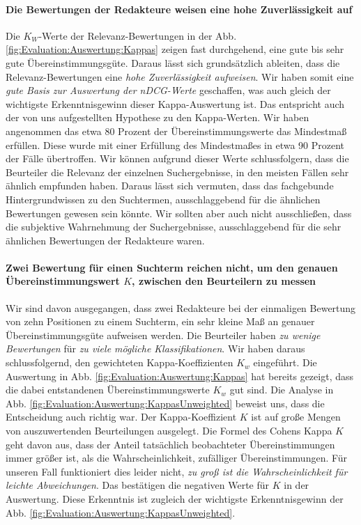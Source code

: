 \paragraph{Die Bewertungen der Redakteure weisen eine hohe Zuverlässigkeit auf} 
Die $K_W$-Werte der Relevanz-Bewertungen in der Abb. \ref{fig:Evaluation:Auswertung:Kappas} zeigen fast durchgehend, eine gute bis sehr gute Übereinstimmungsgüte. Daraus lässt sich grundsätzlich ableiten, dass die Relevanz-Bewertungen eine \textit{hohe Zuverlässigkeit aufweisen}. Wir haben somit eine \textit{gute Basis zur Auswertung der nDCG-Werte} geschaffen, was auch gleich der wichtigste Erkenntnisgewinn dieser Kappa-Auswertung ist. Das entspricht auch der von uns aufgestellten Hypothese zu den Kappa-Werten. Wir haben angenommen das etwa 80 Prozent der Übereinstimmungswerte das Mindestmaß erfüllen. Diese wurde mit einer Erfüllung des Mindestmaßes in etwa 90 Prozent der Fälle übertroffen. Wir können aufgrund dieser Werte schlussfolgern, dass die Beurteiler die Relevanz der einzelnen Suchergebnisse, in den meisten Fällen sehr ähnlich empfunden haben. Daraus lässt sich vermuten, dass das fachgebunde Hintergrundwissen zu den Suchtermen, ausschlaggebend für die ähnlichen Bewertungen gewesen sein könnte. Wir sollten aber auch nicht ausschließen, dass die subjektive Wahrnehmung der Suchergebnisse, ausschlaggebend für die sehr ähnlichen Bewertungen der Redakteure waren. 

\paragraph{Zwei Bewertung für einen Suchterm reichen nicht, um den genauen Übereinstimmungswert $K$, zwischen den Beurteilern zu messen} 
Wir sind davon ausgegangen, dass zwei Redakteure bei der einmaligen Bewertung von zehn Positionen zu einem Suchterm, ein sehr kleine Maß an genauer Übereinstimmungsgüte aufweisen werden. Die Beurteiler haben \textit{zu wenige Bewertungen} für \textit{zu viele mögliche Klassifikationen}. Wir haben daraus schlussfolgernd, den gewichteten Kappa-Koeffizienten $K_w$ eingeführt. Die Auswertung in Abb. \ref{fig:Evaluation:Auswertung:Kappas} hat bereits gezeigt, dass die dabei entstandenen Übereinstimmungswerte $K_w$ gut sind. Die Analyse in Abb. \ref{fig:Evaluation:Auswertung:KappasUnweighted} beweist uns, dass die Entscheidung auch richtig war. Der Kappa-Koeffizient $K$ ist auf große Mengen von auszuwertenden Beurteilungen ausgelegt. Die Formel des Cohens Kappa $K$ geht davon aus, dass der Anteil tatsächlich beobachteter Übereinstimmungen immer größer ist, als die Wahrscheinlichkeit, zufälliger Übereinstimmungen. Für unseren Fall funktioniert dies leider nicht, \textit{zu groß ist die Wahrscheinlichkeit für leichte Abweichungen}. Das bestätigen die negativen Werte für $K$ in der Auswertung. Diese Erkenntnis ist zugleich der wichtigste Erkenntnisgewinn der Abb. \ref{fig:Evaluation:Auswertung:KappasUnweighted}.

